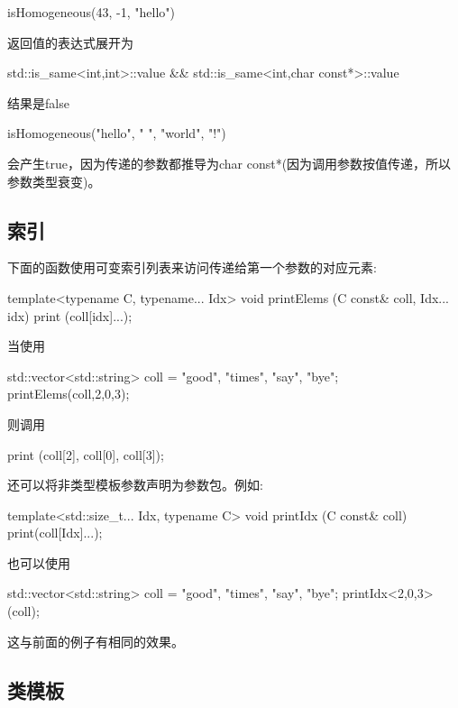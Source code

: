 \begin{cpp}
isHomogeneous(43, -1, "hello")
\end{cpp}

返回值的表达式展开为

\begin{cpp}
std::is_same<int,int>::value && std::is_same<int,char const*>::value
\end{cpp}

结果是false

\begin{cpp}
isHomogeneous("hello", " ", "world", "!")
\end{cpp}

会产生true，因为传递的参数都推导为char const*(因为调用参数按值传递，所以参数类型衰变)。

\subsection{索引}

下面的函数使用可变索引列表来访问传递给第一个参数的对应元素:

\begin{cpp}
template<typename C, typename... Idx>
void printElems (C const& coll, Idx... idx)
{
	print (coll[idx]...);
}
\end{cpp}

当使用

\begin{cpp}
std::vector<std::string> coll = {"good", "times", "say", "bye"};
printElems(coll,2,0,3);
\end{cpp}

则调用

\begin{shell}
print (coll[2], coll[0], coll[3]);
\end{shell}

还可以将非类型模板参数声明为参数包。例如:

\begin{cpp}
template<std::size_t... Idx, typename C>
void printIdx (C const& coll)
{
	print(coll[Idx]...);
}
\end{cpp}

也可以使用

\begin{cpp}
std::vector<std::string> coll = {"good", "times", "say", "bye"};
printIdx<2,0,3>(coll);
\end{cpp}

这与前面的例子有相同的效果。

\subsection{类模板}

